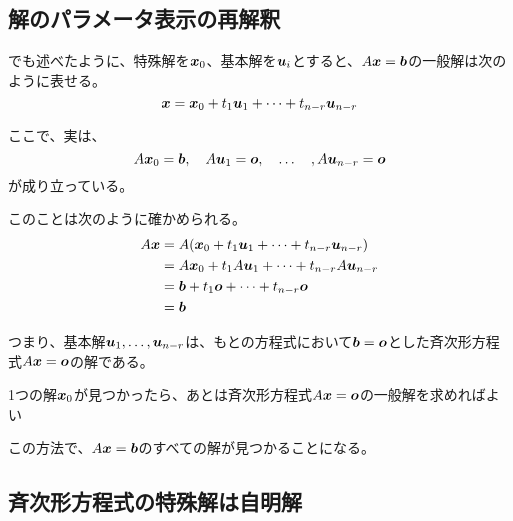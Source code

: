\documentclass[../../../topic_linear-algebra]{subfiles}
\begin{document}
\subsection{解のパラメータ表示の再解釈}\label{sec:reinterpretation-of-parametric-solution}

でも述べたように、特殊解を$\vb*{x}_0$、基本解を$\vb*{u}_i$とすると、$A\vb*{x} = \vb*{b}$の一般解は次のように表せる。
\begin{equation*}
  \vb*{x} = \vb*{x}_0 + t_1\vb*{u}_1 + \cdots + t_{n-r}\vb*{u}_{n-r}
\end{equation*}

ここで、実は、
\begin{equation*}
  A\vb*{x}_0 = \vb*{b},\quad A\vb*{u}_1 = \vb*{o},\quad \dots \quad , A\vb*{u}_{n-r} = \vb*{o}
\end{equation*}
が成り立っている。

\br

このことは次のように確かめられる。
\begin{align*}
  A\vb*{x} & = A(\vb*{x}_0 + t_1\vb*{u}_1 + \cdots + t_{n-r}\vb*{u}_{n-r}) \\
           & = A\vb*{x}_0 + t_1A\vb*{u}_1 + \cdots + t_{n-r}A\vb*{u}_{n-r} \\
           & = \vb*{b} + t_1\vb*{o} + \cdots + t_{n-r}\vb*{o}              \\
           & = \vb*{b}
\end{align*}

\br

つまり、基本解$\vb*{u}_1,\dots,\vb*{u}_{n-r}$は、もとの方程式において$\vb*{b} = \vb*{o}$とした斉次形方程式$A\vb*{x} = \vb*{o}$の解である。

\begin{emphabox}
  \begin{spacebox}
    \begin{center}
      1つの解$\vb*{x}_0$が見つかったら、あとは斉次形方程式$A\vb*{x} = \vb*{o}$の一般解を求めればよい
    \end{center}
  \end{spacebox}
\end{emphabox}

この方法で、$A\vb*{x} = \vb*{b}$のすべての解が見つかることになる。

\subsection{斉次形方程式の特殊解は自明解}
\end{document}
